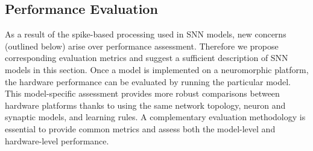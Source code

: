 \documentclass{frontiersENG} %
\begin{document}
\subsection{Performance Evaluation}
\label{sec:eval}
As a result of the spike-based processing used in SNN models, new concerns (outlined below) arise over performance assessment.
Therefore we propose corresponding evaluation metrics and suggest a sufficient description of SNN models in this section.
Once a model is implemented on a neuromorphic platform, the hardware performance can be evaluated by running the particular model.
This model-specific assessment provides more robust comparisons between hardware platforms thanks to using the same network topology, neuron and synaptic models, and learning rules. 
A complementary evaluation methodology is essential to provide common metrics and assess both the model-level and hardware-level performance.
\end{document}
